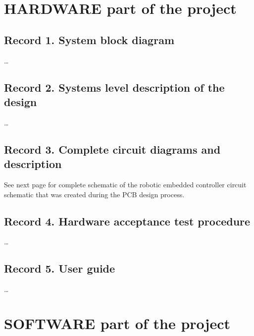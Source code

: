 
\section{HARDWARE part of the project}

\subsection{Record 1. System block diagram}

\ldots

\newpage

\subsection{Record 2.  Systems level description of the design}

\ldots

\newpage

\subsection{Record 3. Complete circuit diagrams and description}

See next page for complete schematic of the robotic embedded controller circuit schematic that was created during the PCB design process.



\subsection{Record 4. Hardware acceptance test procedure}

\ldots

\newpage

\subsection{Record 5. User guide}

\ldots

\newpage


\section{SOFTWARE part of the project}


